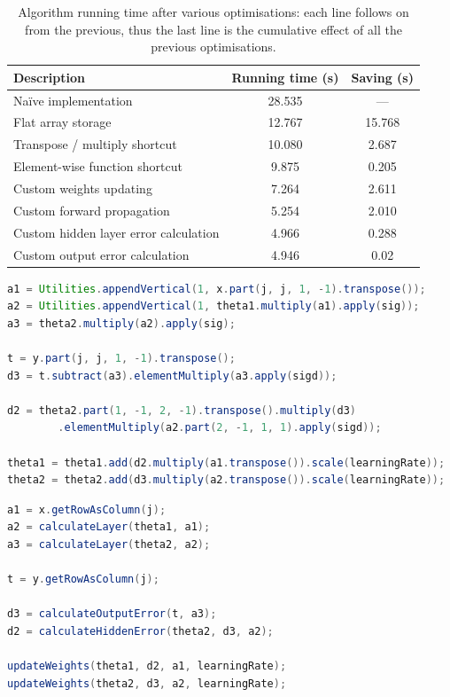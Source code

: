 \begin{table}[ht]
\centering
\begin{tabular}{lcc}
\toprule
Description & Running time (s) & Saving (s) \\
\midrule
Na\"{i}ve implementation & 28.535 & --- \\
Flat array storage & 12.767 & 15.768 \\
Transpose / multiply shortcut & 10.080 & 2.687 \\
Element-wise function shortcut & 9.875 & 0.205 \\
Custom weights updating & 7.264 & 2.611 \\
Custom forward propagation & 5.254 & 2.010 \\
Custom hidden layer error calculation & 4.966 & 0.288 \\
Custom output error calculation & 4.946 & 0.02 \\
\bottomrule
\end{tabular}
\caption[Algorithm running time after various optimisations]{Algorithm running time after various optimisations: each line follows on from the previous, thus the last line is the cumulative effect of all the previous optimisations.}
\label{tab:optimisations}
\end{table}

\begin{lstlisting}[language=Java,caption={Neural network algorithm before optimisation},label=lst:before,captionpos=b,float]
a1 = Utilities.appendVertical(1, x.part(j, j, 1, -1).transpose());
a2 = Utilities.appendVertical(1, theta1.multiply(a1).apply(sig));
a3 = theta2.multiply(a2).apply(sig);

t = y.part(j, j, 1, -1).transpose();
d3 = t.subtract(a3).elementMultiply(a3.apply(sigd));

d2 = theta2.part(1, -1, 2, -1).transpose().multiply(d3)
		.elementMultiply(a2.part(2, -1, 1, 1).apply(sigd));

theta1 = theta1.add(d2.multiply(a1.transpose()).scale(learningRate));
theta2 = theta2.add(d3.multiply(a2.transpose()).scale(learningRate));
\end{lstlisting}

\begin{lstlisting}[language=Java,caption={Neural network algorithm after optimisation},label=lst:after,captionpos=b,float]
a1 = x.getRowAsColumn(j);
a2 = calculateLayer(theta1, a1);
a3 = calculateLayer(theta2, a2);

t = y.getRowAsColumn(j);

d3 = calculateOutputError(t, a3);
d2 = calculateHiddenError(theta2, d3, a2);

updateWeights(theta1, d2, a1, learningRate);
updateWeights(theta2, d3, a2, learningRate);
\end{lstlisting}
